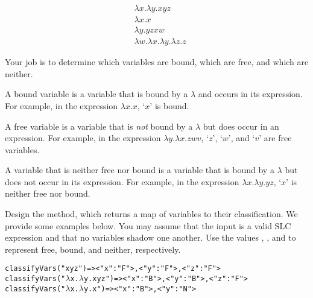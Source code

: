 
\begin{align*}
  & \lambda{}x.\lambda{y}.xyz\\
  & \lambda{x}.x\\
  & \lambda{y}.yzxw\\
  & \lambda{w}.\lambda{x}.\lambda{y}.\lambda{z}.z
\end{align*}

Your job is to determine which variables are bound, which are free, and which are neither.

A bound variable is a variable that is bound by a $\lambda$ and occurs in its expression. For example, in the expression $\lambda{x}.x$, `$x$' is bound.

A free variable is a variable that is \textit{not} bound by a $\lambda$ but does occur in an expression. For example, in the expression $\lambda{y}.\lambda{x}.zwv$, `$z$', `$w$', and `$v$' are free variables.

A variable that is neither free nor bound is a variable that is bound by a $\lambda$ but does not occur in its expression. For example, in the expression $\lambda{}x.\lambda{}y.yz$, `$x$' is neither free nor bound.

Design the  method, which returns a map of variables to their classification. We provide some examples below. You may assume that the input is a valid SLC expression and that no variables shadow one another. Use the values , , and  to represent free, bound, and neither, respectively.
\begin{alltt}
classifyVars("xyz")       => {<"x" : "F">, <"y" : "F">, <"z" : "F">}
classifyVars("\(\lambda\)x.\(\lambda\)y.xyz") => {<"x" : "B">, <"y" : "B">, <"z" : "F">}
classifyVars("\(\lambda\)x.\(\lambda\)y.x")   => {<"x" : "B">, <"y" : "N">}
\end{alltt}

